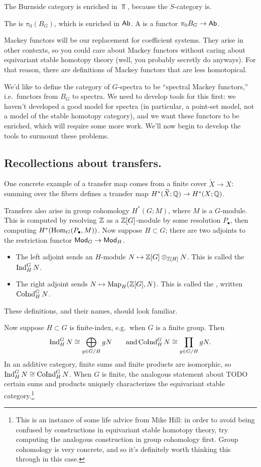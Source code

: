 The Burnside category is enriched in $\Top$, because the $S$-category is.
\begin{defn}
The  is $\pi_0(B_G)$, which is enriched in $\mathsf{Ab}$. A  is a
functor $\pi_0B_G\to\mathsf{Ab}$.
\end{defn}
Mackey functors will be our replacement for coefficient systems. They arise in other contexts, so you could care
about Mackey functors without caring about equivariant stable homotopy theory (well, you probably secretly do
anyways). For that reason, there are definitions of Mackey functors that are less homotopical.

We'd like to define the category of $G$-spectra to be ``spectral Mackey functors,'' i.e.\ functors from $B_G$ to
spectra. We need to develop tools for this first: we haven't developed a good model for spectra (in particular, a
point-set model, not a model of the stable homotopy category), and we want these functors to be enriched, which
will require some more work. We'll now begin to develop the tools to surmount these problems.
\subsection*{Recollections about transfers.}
One concrete example of a transfer map comes from a finite cover $\widetilde X\to X$: summing over the fibers
defines a transfer map $H^*(\widetilde X;\mathbb Q)\to H^*(X;\mathbb Q)$.

Transfers also arise in group cohomology $H^*(G;M)$, where $M$ is a $G$-module. This is computed by resolving $\mathbb Z$
as a $\mathbb Z[G]$-module by some resolution $P_\bullet$, then computing $H^*(\operatorname{Hom}_G(P_\bullet, M))$. Now suppose
$H\subset G$; there are two adjoints to the restriction functor $\mathsf{Mod}_G\to\mathsf{Mod}_H$.
\begin{itemize}
	\item The left adjoint sends an $H$-module $N\mapsto \Z[G]\otimes_{\Z[H]} N$. This is called the  $\operatorname{Ind}_H^G N$.
	\item The right adjoint sends $N\mapsto\Map_H(\Z[G], N)$. This is called the ,
	written $\operatorname{CoInd}_H^GN$.
\end{itemize}
These definitions, and their names, should look familiar.

Now suppose $H\subset G$ is finite-index, e.g.\ when $G$ is a finite group. Then
\[\operatorname{Ind}_H^G N\cong\bigoplus_{g\in G/H} gN\qquad\text{and} \operatorname{CoInd}_H^G N\cong\prod_{g\in G/H} gN.\]
In an additive category, finite sums and finite products are isomorphic, so $\operatorname{Ind}_H^GN\cong\operatorname{CoInd}_H^G N$. When $G$
is finite, the analogous statement about {\color{red}TODO} certain sums and products uniquely characterizes the
equivariant stable category.\footnote{This is an instance of some life advice from Mike Hill: in order to avoid
being confused by constructions in equivariant stable homotopy theory, try computing the analogous construction in
group cohomology first. Group cohomology is very concrete, and so it's definitely worth thinking this through in
this case.}

